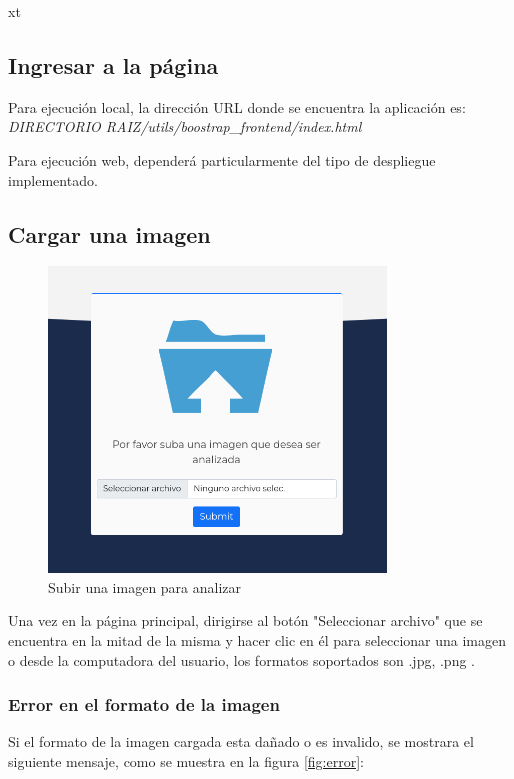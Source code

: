 xt

\subsection{Ingresar a la página}
Para ejecución local, la dirección URL donde se encuentra la aplicación es: 
\textit{DIRECTORIO RAIZ/utils/boostrap\_frontend/index.html}

Para ejecución web, dependerá particularmente del tipo de despliegue implementado.

\subsection{Cargar una imagen}

\begin{figure}[b!]
    \centering
    \includegraphics[width=0.8\textwidth]{img/FE - upload file.png}
    \caption{Subir una imagen para analizar}
    \label{fig:subir imagen}
\end{figure}

Una vez en la página principal, dirigirse al botón "Seleccionar archivo" que se encuentra en la mitad de la misma y hacer clic en él para seleccionar una imagen o desde la computadora del usuario, los formatos soportados son .jpg, .png .

\subsubsection{Error en el formato de la imagen}

Si el formato de la imagen cargada esta dañado o es invalido, se mostrara el siguiente mensaje, como se muestra en la figura \ref{fig:error}:

